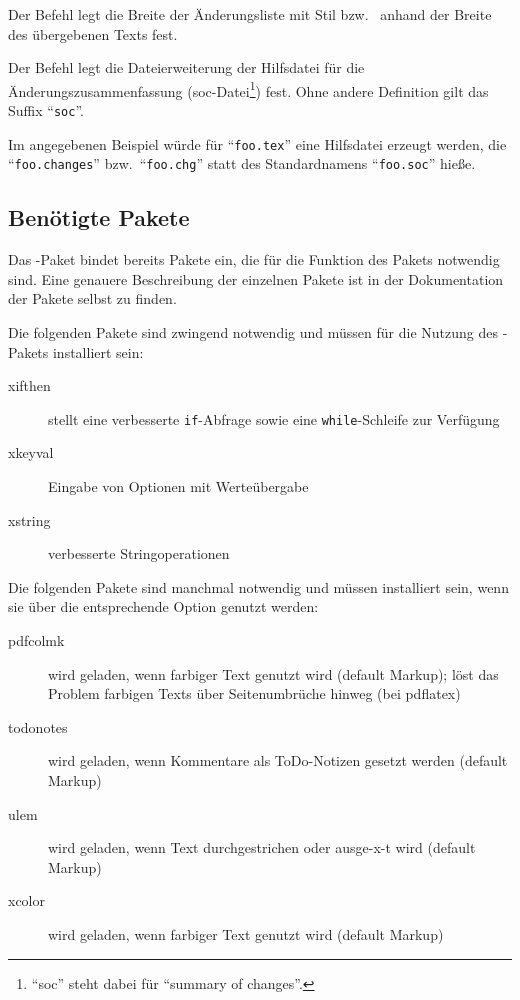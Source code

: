 Der Befehl  legt die Breite der Änderungsliste mit Stil  bzw.\  anhand der Breite des übergebenen Texts fest.






Der Befehl  legt die Dateierweiterung der Hilfsdatei für die Änderungszusammenfassung (soc-Datei\footnote{%
	"`soc"' steht dabei für "`summary of changes"'.
}) fest.
Ohne andere Definition gilt das Suffix "`\texttt{soc}"'.

Im angegebenen Beispiel würde für "`\texttt{foo.tex}"' eine Hilfsdatei erzeugt werden, die "`\texttt{foo.changes}"' bzw.\ "`\texttt{foo.chg}"' statt des Standardnamens "`\texttt{foo.soc}"' hieße.




\subsection{Benötigte Pakete}
\label{sec:ui:packages}

Das -Paket bindet bereits Pakete ein, die für die Funktion des Pakets notwendig sind.
Eine genauere Beschreibung der einzelnen Pakete ist in der Dokumentation der Pakete selbst zu finden.

Die folgenden Pakete sind zwingend notwendig und müssen für die Nutzung des -Pakets installiert sein:
\begin{description}
	\item [xifthen] stellt eine verbesserte \texttt{if}-Abfrage sowie eine \texttt{while}-Schleife zur Verfügung
	\item [xkeyval] Eingabe von Optionen mit Werteübergabe
	\item [xstring] verbesserte Stringoperationen
\end{description}

Die folgenden Pakete sind manchmal notwendig und müssen installiert sein, wenn sie über die entsprechende Option genutzt werden:
\begin{description}
	\item [pdfcolmk] wird geladen, wenn farbiger Text genutzt wird (default Markup); löst das Problem farbigen Texts über Seitenumbrüche hinweg (bei pdflatex)
	\item [todonotes] wird geladen, wenn Kommentare als ToDo-Notizen gesetzt werden (default Markup)
	\item [ulem] wird geladen, wenn Text durchgestrichen oder ausge-x-t wird (default Markup)
	\item [xcolor] wird geladen, wenn farbiger Text genutzt wird (default Markup)
\end{description}


